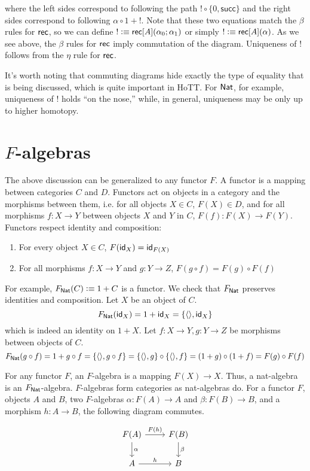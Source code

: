 \documentclass[11pt]{article}
\newcommand*{\z}{0}
\newcommand*{\s}{\mathsf{succ}}
\newcommand*{\triv}{\langle \rangle}
\newcommand*{\comp}{\circ}
\begin{document}
where the left sides correspond to following the path $! \comp \{\z, \s\}$
and the right sides correspond to following $\alpha \comp 1 + !$. Note that
these two equations match the $\beta$ rules for $\mathsf{rec}$, so we can define
$! \vcentcolon\equiv \mathsf{rec}[A](\alpha_0; \alpha_1)$ or simply $! \vcentcolon\equiv \mathsf{rec}[A](\alpha)$.
As we see above, the $\beta$ rules for $\mathsf{rec}$ imply
commutation of the diagram. Uniqueness of $!$ follows from the $\eta$ rule
for $\mathsf{rec}$.

It's worth noting that commuting diagrams hide exactly the type of equality
that is being discussed, which is quite
important in HoTT. For $\mathsf{Nat}$, for example, uniqueness of $!$ holds ``on
the nose,'' while, in general, uniqueness may be only up to higher homotopy.

\section{$F$-algebras}
The above discussion can be generalized to any functor $F$. A functor is
a mapping between categories $C$ and $D$. Functors act on objects in a
category and the morphisms between them, i.e. for all objects $X \in C$,
$F(X) \in D$, and for all morphisms $f: X \to Y$ between objects $X$ and $Y$
in $C$, $F(f): F(X) \to F(Y)$. 
Functors respect identity and composition:
  \begin{enumerate}
  \item For every object $X \in C$, $F(\textsf{id}_X) = \textsf{id}_{F(X)}$
  \item For all morphisms $f: X \to Y$ and $g: Y \to Z$, 
    $F(g\comp f) = F(g)\comp F(f)$
  \end{enumerate}
\cite{WikiFunctor}

For example, $F_{\mathsf{Nat}}(C) \vcentcolon\equiv 1 + C$ is a functor. We check that $F_{\mathsf{Nat}}$
preserves identities and composition. Let $X$ be an object of $C$.
\[F_\Nat(\id_X) = 1 + \id_X = \{\triv, \id_X\}\]
which is indeed an identity
on $1 + X$. Let $f: X\to Y, g: Y \to Z$ be morphisms between objects of $C$.
\[F_\Nat(g \comp f) = 1 + g \comp f = \{\triv, g \comp f\} =
\{\triv, g\} \comp \{\triv, f\} = (1 + g) \comp (1 + f) = F(g) \comp F(f)\]

For any functor $F$, an $F$-algebra is a mapping $F(X) \to X$. Thus,
a nat-algebra is an $F_{\mathsf{Nat}}$-algebra. $F$-algebras form categories as
nat-algebras do. For a functor $F$, objects $A$ and $B$, two $F$-algebras
$\alpha: F(A) \to A$ and $\beta: F(B) \to B$, and a morphism $h: A \to B$,
the following diagram commutes.

\[
\begin{tikzcd}
F(A) \arrow{d}{\alpha} \arrow{r}{F(h)} & F(B) \arrow{d}{\beta}\\
A \arrow{r}{h} & B
\end{tikzcd}
\]
\end{document}
